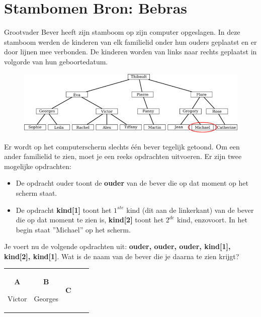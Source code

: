 \documentclass[12pt, a4paper]{article}
\begin{document}
	\begin{minipage}{\textwidth}
		\section{Stambomen \hfill\small Bron: Bebras}
			
			Grootvader Bever heeft zijn stamboom op zijn computer opgeslagen. In deze stamboom werden de kinderen van elk familielid onder hun ouders geplaatst en er door lijnen mee verbonden. De kinderen worden van links naar rechts geplaatst in volgorde van hun geboortedatum.
			
			\begin{figure}[H]
				\centering
				\includegraphics[width=\linewidth]{image1} 
			\end{figure}
			
			Er wordt op het computerscherm slechts \'e\'en bever tegelijk getoond. Om een ander familielid te zien, moet je een reeks opdrachten uitvoeren. Er zijn twee mogelijke opdrachten:
			\begin{itemize}
				\item De opdracht ouder toont de \textbf{ouder} van de bever die op dat moment op het scherm staat.
				\item De opdracht \textbf{kind[1]} toont het $1^{ste}$ kind (dit aan de linkerkant) van de bever die op dat moment te zien is, \textbf{kind[2]} toont het $2^{de}$ kind, enzovoort.
				In het begin staat ''Michael'' op het scherm.
			\end{itemize}
			Je voert nu de volgende opdrachten uit: \textbf{ouder, ouder, ouder, kind[1], kind[2], kind[1]}. Wat is de naam van de bever die je daarna te zien krijgt?
			
			\begin{table}[H]
				\centering 
				\begin{tabulary}{\linewidth}{|C|C|C|C|C|}
					\hline
					\textbf{A} \vspace{0.1cm}
					
					Victor
					&
					\textbf{B} \vspace{0.1cm}
					
					Georges	
					&
					\textbf{C} \vspace{0.1cm}
					

\end{tabulary}
\end{table}
\end{minipage}
\end{document}
